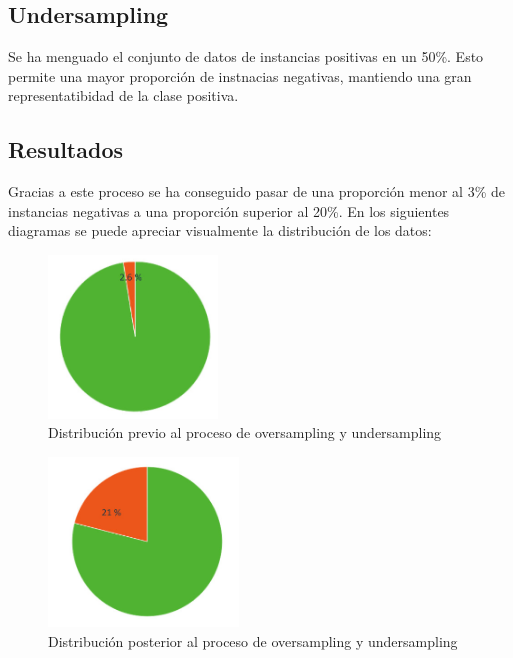 \documentclass[12pt]{report} %
\begin{document}
    \subsection{Undersampling}

    Se ha menguado el conjunto de datos de instancias positivas en un 50\%. Esto permite una mayor proporción de instnacias negativas, mantiendo una gran representatibidad de la clase positiva.

    \subsection{Resultados}

    Gracias a este proceso se ha conseguido pasar de una proporción menor al 3\% de instancias negativas a una proporción superior al 20\%. En los siguientes diagramas se puede apreciar visualmente la distribución de los datos: 

\begin{minipage}{0.45\textwidth}
    \begin{figure}[H]
    \includegraphics[width=0.4\textwidth]{datos-prev.jpg}
    \caption  {\small{Distribución previo al proceso de oversampling y undersampling}}
    \end{figure}
\end{minipage}
\hspace{0.5cm}
\begin{minipage}{0.45\textwidth}
    \begin{figure}[H]
    \includegraphics[width=0.45\textwidth]{datos-post.jpg}
    \caption  {\small{Distribución posterior al proceso de oversampling y undersampling}}
    \end{figure}
\end{minipage}
\end{document}

